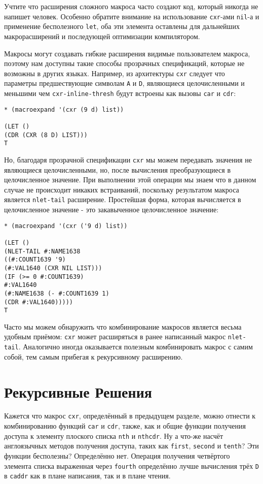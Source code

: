 Учтите что расширения сложного макроса часто создают код, который никогда не напишет человек. Особенно обратите внимание на использование \verb"cxr"-ами \verb"nil"-а и применение бесполезного \verb"let", оба эти элемента оставлены для дальнейших макрорасширений и последующей оптимизации компилятором.

Макросы могут создавать гибкие расширения видимые пользователем макроса, поэтому нам доступны такие способы прозрачных спецификаций, которые не возможны в других языках. Например, из архитектуры \verb"cxr" следует что параметры предшествующие символам \verb"A" и \verb"D", являющиеся целочисленными и меньшими чем \verb"cxr-inline-thresh" будут встроены как вызовы \verb"car" и \verb"cdr":

\begin{verbatim}
* (macroexpand '(cxr (9 d) list))

(LET ()
(CDR (CXR (8 D) LIST)))
T
\end{verbatim}

Но, благодаря прозрачной спецификации \verb"cxr" мы можем передавать значения не являющиеся целочисленными, но, после вычисления преобразующиеся в целочисленное значение. При выполнении этой операции мы знаем что в данном случае не происходит никаких встраиваний, поскольку результатом макроса является \verb"nlet-tail" расширение. Простейшая форма, которая вычисляется в целочисленное значение - это закавыченное целочисленное значение:

\begin{verbatim}
* (macroexpand '(cxr ('9 d) list))

(LET ()
(NLET-TAIL #:NAME1638
((#:COUNT1639 '9)
(#:VAL1640 (CXR NIL LIST)))
(IF (>= 0 #:COUNT1639)
#:VAL1640
(#:NAME1638 (- #:COUNT1639 1)
(CDR #:VAL1640)))))
T
\end{verbatim}

Часто мы можем обнаружить что комбинирование макросов является весьма удобным приёмом: \verb"cxr" может расширяться в ранее написанный макрос \verb"nlet-tail". Аналогично иногда оказывается полезным комбинировать макрос с самим собой, тем самым прибегая к рекурсивному расширению.

\section{Рекурсивные Решения}\label{section_recursive_solutions}

Кажется что макрос \verb"cxr", определённый в предыдущем разделе, можно отнести к комбинированию функций \verb"car" и \verb"cdr", также, как и общие функции получения доступа к элементу плоского списка \verb"nth" и \verb"nthcdr". Ну а что-же насчёт англоязычных методов получения доступа, таких как \verb"first", \verb"second" и \verb"tenth"? Эти функции бесполезны? Определённо нет. Операция получения четвёртого элемента списка выраженная через \verb"fourth" определённо лучше вычисления трёх \verb"D" в \verb"caddr" как в плане написания, так и в плане чтения.

